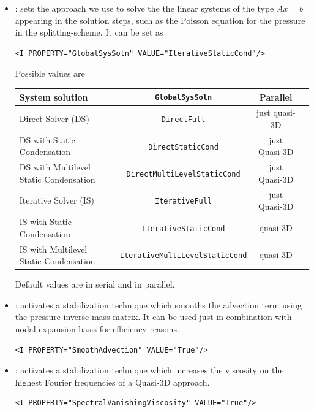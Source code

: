 \begin{itemize}
\item {}: sets the approach we use to solve the the linear
systems of the type $Ax=b$ appearing in the solution steps, such as the Poisson
equation for the pressure in the splitting-scheme. It can be set as

\begin{lstlisting}[style=XMLStyle]
<I PROPERTY="GlobalSysSoln" VALUE="IterativeStaticCond"/>
\end{lstlisting}

Possible values are
\begin{center}
\footnotesize
\begin{tabular}{lccc}
\toprule
{System solution} & \texttt{GlobalSysSoln} &{Parallel}\\
\midrule
Direct Solver (DS) & \texttt{DirectFull} & just quasi-3D \\
DS with Static Condensation  & \texttt{DirectStaticCond} & just Quasi-3D \\
DS with Multilevel Static Condensation & \texttt{DirectMultiLevelStaticCond} & just Quasi-3D \\
 Iterative Solver (IS) & \texttt{IterativeFull} & just Quasi-3D \\
IS with Static Condensation  & \texttt{IterativeStaticCond} & quasi-3D \\
IS with Multilevel Static Condensation & \texttt{IterativeMultiLevelStaticCond} & quasi-3D \\
\bottomrule
\end{tabular}
\end{center}

Default values are  in serial and
 in parallel.

\item {}: activates a stabilization technique which smooths
the advection term using the pressure inverse mass matrix. It can be used just in combination with nodal expansion basis for efficiency reasons.

\begin{lstlisting}[style=XMLStyle]
<I PROPERTY="SmoothAdvection" VALUE="True"/>
\end{lstlisting}


\item {}: activates a stabilization technique
which increases the viscosity on the highest Fourier frequencies of a Quasi-3D approach.
\begin{lstlisting}[style=XMLStyle]
<I PROPERTY="SpectralVanishingViscosity" VALUE="True"/>
\end{lstlisting}


\end{itemize}
